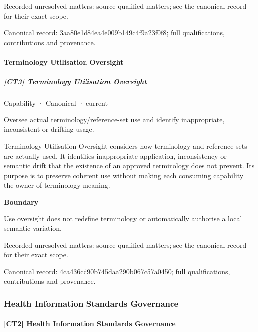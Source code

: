{\small Recorded unresolved matters: source-qualified matters; see the canonical record for their exact scope.}\par
{\footnotesize \href{../../../../continuum/strategy/capability/3aa80e1d84ea4e009b149c4f9a23f0f8.md}{Canonical record: 3aa80e1d84ea4e009b149c4f9a23f0f8}; full qualifications, contributions and provenance.}\par
\paragraph{Terminology Utilisation Oversight}

\subparagraph{[CT3] Terminology Utilisation Oversight}

\label{element:4ca436cd90b745daa290b067c57a0450}
{\small Capability · Canonical · current}\par

Oversee actual terminology/reference-set use and identify inappropriate, inconsistent or drifting usage.



Terminology Utilisation Oversight considers how terminology and reference sets are actually used. It identifies inappropriate application, inconsistency or semantic drift that the existence of an approved terminology does not prevent. Its purpose is to preserve coherent use without making each consuming capability the owner of terminology meaning.



\textbf{Boundary}



Use oversight does not redefine terminology or automatically authorise a local semantic variation.


{\small Recorded unresolved matters: source-qualified matters; see the canonical record for their exact scope.}\par
{\footnotesize \href{../../../../continuum/strategy/capability/4ca436cd90b745daa290b067c57a0450.md}{Canonical record: 4ca436cd90b745daa290b067c57a0450}; full qualifications, contributions and provenance.}\par
\subsubsection{Health Information Standards Governance}

\paragraph{[CT2] Health Information Standards Governance}

